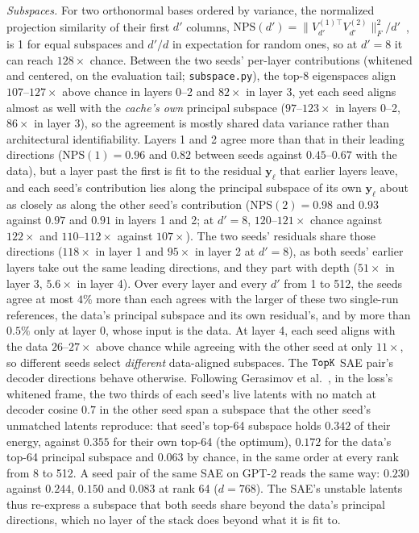 \emph{Subspaces.} For two orthonormal bases ordered by variance, the
normalized projection similarity of their first $d'$ columns,
$\mathrm{NPS}(d') = \lVert V^{(1)\top}_{d'}V^{(2)}_{d'}\rVert_F^2/d'$~\cite{hu2021},
is 1 for equal subspaces and $d'/d$ in expectation for random ones, so at
$d'{=}8$ it can reach $128\times$ chance. Between the two seeds' per-layer
contributions (whitened and centered, on the evaluation tail;
\texttt{subspace.py}), the top-8 eigenspaces align $107$--$127\times$ above
chance in layers 0--2 and $82\times$ in layer 3, yet each seed aligns almost
as well with the \emph{cache's own} principal subspace ($97$--$123\times$ in
layers 0--2, $86\times$ in layer 3), so the agreement is mostly shared data
variance rather than architectural identifiability. Layers 1 and 2 agree
more than that in their leading directions ($\mathrm{NPS}(1) = 0.96$ and
$0.82$ between seeds against $0.45$--$0.67$ with the data), but a layer past
the first is fit to the residual $\mathbf{y}_\ell$ that earlier layers
leave, and each seed's contribution lies along the principal subspace of
its own $\mathbf{y}_\ell$ about as closely as along the other seed's
contribution ($\mathrm{NPS}(2) = 0.98$ and $0.93$ against $0.97$ and $0.91$
in layers 1 and 2; at $d'{=}8$, $120$--$121\times$ chance against $122\times$
and $110$--$112\times$ against $107\times$). The two seeds' residuals share
those directions ($118\times$ in layer 1 and $95\times$ in layer 2 at
$d'{=}8$), as both seeds' earlier layers take out the same leading
directions, and they part with depth ($51\times$ in layer 3, $5.6\times$ in
layer 4). Over every layer and every $d'$ from 1 to 512, the seeds agree at
most $4\%$ more than each agrees with the larger of these two single-run
references, the data's principal subspace and its own residual's, and by
more than $0.5\%$ only at layer 0, whose input is the data. At layer 4, each seed aligns
with the data $26$--$27\times$ above chance while agreeing with the other
seed at only $11\times$, so different seeds select \emph{different}
data-aligned subspaces. The $\mathop{\mathtt{TopK}}\limits$ SAE pair's decoder directions behave
otherwise. Following Gerasimov et al.~\cite{gerasimov2026}, in the loss's
whitened frame, the two thirds of each seed's live latents with no match
at decoder cosine $0.7$ in the other seed span a subspace that the other
seed's unmatched latents reproduce: that seed's top-64 subspace holds
$0.342$ of their energy, against $0.355$ for their own top-64 (the
optimum), $0.172$ for the data's top-64 principal subspace and $0.063$ by
chance, in the same order at every rank from 8 to 512. A seed pair of the
same SAE on GPT-2 reads the same way: $0.230$ against $0.244$, $0.150$ and
$0.083$ at rank 64 ($d{=}768$). The SAE's unstable
latents thus re-express a subspace that both seeds share beyond the data's
principal directions, which no layer of the stack does beyond what it is
fit to.

